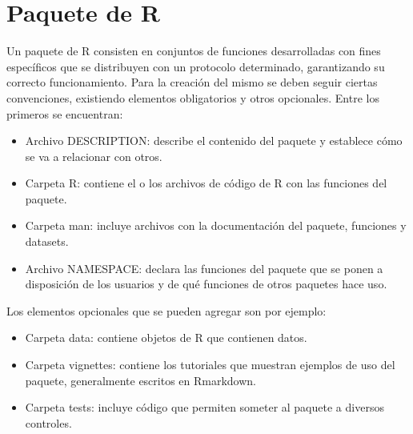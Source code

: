 \section{Paquete de R}



Un paquete de R consisten en conjuntos de funciones desarrolladas con fines específicos que se distribuyen con un protocolo determinado, garantizando su correcto funcionamiento.  Para la creación del mismo se deben seguir ciertas convenciones, existiendo elementos obligatorios y otros opcionales. Entre los primeros se encuentran:

\begin{itemize}
	\item Archivo DESCRIPTION: describe el contenido del paquete y establece cómo se va a relacionar con otros.
\end{itemize}

\begin{itemize}
	\item Carpeta R: contiene el o los archivos de código de R con las funciones del paquete.
\end{itemize}

\begin{itemize}
	\item Carpeta man: incluye archivos con la documentación del paquete, funciones y datasets.
\end{itemize}

\begin{itemize}
	\item Archivo NAMESPACE: declara las funciones del paquete que se ponen a disposición de los usuarios y de qué funciones de otros paquetes hace uso.
\end{itemize}


Los elementos opcionales que se pueden agregar son por ejemplo:

\begin{itemize}
	\item Carpeta data: contiene objetos de R que contienen datos.
\end{itemize}

\begin{itemize}
	\item Carpeta vignettes: contiene los tutoriales que muestran ejemplos de uso del paquete, generalmente escritos en Rmarkdown.
\end{itemize}

\begin{itemize}
	\item Carpeta tests: incluye código que permiten someter al paquete a diversos controles.
\end{itemize}

